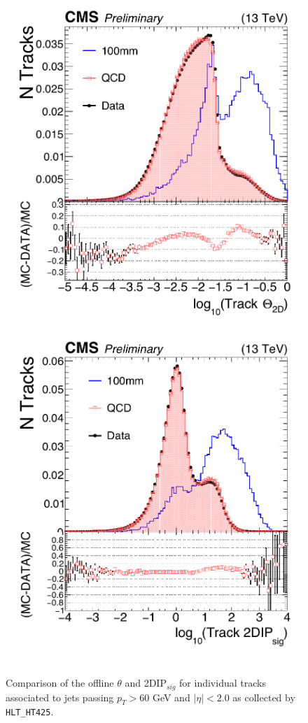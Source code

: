 \begin{figure}
\begin{center}
\includegraphics[width=.45\textwidth]{figures/an/SYSTEMATICS/76x_pu/SYS_offline_theta.pdf}
\includegraphics[width=.45\textwidth]{figures/an/SYSTEMATICS/76x_pu/SYS_offline_2dipsig.pdf}
\caption{Comparison of the offline $\theta$ and 2DIP$_{sig}$ for individual tracks associated to jets passing $p_{T} > 60$ GeV and $|\eta| <2.0$ as collected by  \texttt{HLT\_HT425}.   \label{fig:variable_modeling}} 
\end{center}
\end{figure}

